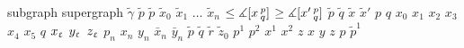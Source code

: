 \documentclass[oneside]{book}
\begin{document}
subgraph%
\stopmpxshipout
\mpxshipout%
supergraph%
\stopmpxshipout
\mpxshipout%
$\tilde\gamma$%
\stopmpxshipout
\mpxshipout%
$\tilde p$%
\stopmpxshipout
\mpxshipout%
$\tilde p$%
\stopmpxshipout
\mpxshipout%
$\tilde x_0$%
\stopmpxshipout
\mpxshipout%
$\tilde x_1$%
\stopmpxshipout
\mpxshipout%
$\dots$%
\stopmpxshipout
\mpxshipout%
$\tilde x_n$%
\stopmpxshipout
\mpxshipout%
$\le \mangle\hinge x p q$%
\stopmpxshipout
\mpxshipout%
$\ge \mangle\hinge{x'}p q$%
\stopmpxshipout
\mpxshipout%
$\tilde p$%
\stopmpxshipout
\mpxshipout%
$\tilde q$%
\stopmpxshipout
\mpxshipout%
$\tilde x$%
\stopmpxshipout
\mpxshipout%
$\tilde x'$%
\stopmpxshipout
\mpxshipout%
$p$%
\stopmpxshipout
\mpxshipout%
$q$%
\stopmpxshipout
\mpxshipout%
$x_0$%
\stopmpxshipout
\mpxshipout%
$x_1$%
\stopmpxshipout
\mpxshipout%
$x_2$%
\stopmpxshipout
\mpxshipout%
$x_3$%
\stopmpxshipout
\mpxshipout%
$x_4$%
\stopmpxshipout
\mpxshipout%
$x_5$%
\stopmpxshipout
\mpxshipout%
$q$%
\stopmpxshipout
\mpxshipout%
$x_\upvarepsilon$%
\stopmpxshipout
\mpxshipout%
$y_\upvarepsilon$%
\stopmpxshipout
\mpxshipout%
$z_\upvarepsilon$%
\stopmpxshipout
\mpxshipout%
$p_n$%
\stopmpxshipout
\mpxshipout%
$x_n$%
\stopmpxshipout
\mpxshipout%
$y_n$%
\stopmpxshipout
\mpxshipout%
$\bar x_n$%
\stopmpxshipout
\mpxshipout%
$\bar y_n$%
\stopmpxshipout
\mpxshipout%
$\tilde p$%
\stopmpxshipout
\mpxshipout%
$\tilde q$%
\stopmpxshipout
\mpxshipout%
$\tilde r$%
\stopmpxshipout
\mpxshipout%
$\tilde z_0$%
\stopmpxshipout
\mpxshipout%
$p^1$%
\stopmpxshipout
\mpxshipout%
$p^2$%
\stopmpxshipout
\mpxshipout%
$x^1$%
\stopmpxshipout
\mpxshipout%
$x^2$%
\stopmpxshipout
\mpxshipout%
$z$%
\stopmpxshipout
\mpxshipout%
$x$%
\stopmpxshipout
\mpxshipout%
$y$%
\stopmpxshipout
\mpxshipout%
$z$%
\stopmpxshipout
\mpxshipout%
$p$%
\stopmpxshipout
\mpxshipout%
$\tilde p^1$%
\stopmpxshipout
\mpxshipout%
\end{document}
